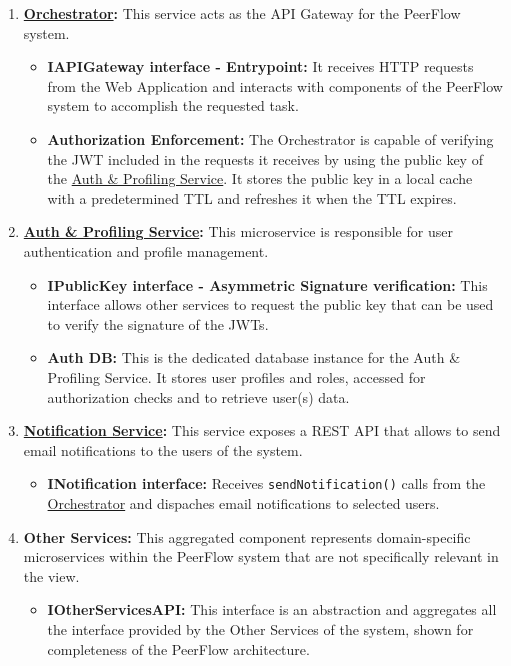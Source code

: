 \begin{enumerate}
    \item \label{def:GenDetailsOrchestrator} \textbf{\hyperref[def:Orchestrator]{Orchestrator}:} This service acts as the API Gateway for the PeerFlow system. 
    \begin{itemize}
        \item \textbf{IAPIGateway interface - Entrypoint:} It receives HTTP requests from the Web Application and interacts with components of the PeerFlow system to accomplish the requested task.

        \item \textbf{Authorization Enforcement:} The Orchestrator is capable of verifying the JWT included in the requests it receives by using the public key of the  \hyperref[def:AuthProfilingService]{Auth \& Profiling Service}. It stores the public key in a local cache with a predetermined TTL and refreshes it when the TTL expires.
    \end{itemize}

    \item \label{def:GenDetailsAuth} \textbf{\hyperref[def:AuthProfilingService]{Auth \& Profiling Service}:} This microservice is responsible for user authentication and profile management. 
    \begin{itemize}
        \item \textbf{IPublicKey interface - Asymmetric Signature verification:} This interface allows other services to request the public key that can be used to verify the signature of the JWTs.
        \item \textbf{Auth DB:} This is the dedicated database instance for the Auth \& Profiling Service. It stores user profiles and roles, accessed for authorization checks and to retrieve user(s) data.
    \end{itemize}

    \item \label{def:GenDetailsNotification} \textbf{\hyperref[def:NotificationService]{Notification Service}:} This service exposes a REST API that allows to send email notifications to the users of the system.
    \begin{itemize}
        \item  \textbf{INotification interface:} Receives \texttt{sendNotification()} calls from the \hyperref[def:Orchestrator]{Orchestrator} and dispaches email notifications to selected users.
    \end{itemize}

    \item \label{def:GenDetailsOtherServices}\textbf{Other Services:} This aggregated component represents domain-specific microservices within the PeerFlow system that are not specifically relevant in the view.
    \begin{itemize}
        \item \textbf{IOtherServicesAPI:} This interface is an abstraction and aggregates all the interface provided by the Other Services of the system, shown for completeness of the PeerFlow architecture.
    \end{itemize}
\end{enumerate}


